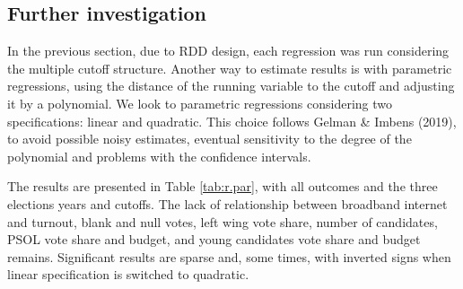 \documentclass[
  12pt,
]{article}
\begin{document}
\hypertarget{further-investigation}{%
\subsection{Further investigation}\label{further-investigation}}

In the previous section, due to RDD design, each regression was run
considering the multiple cutoff structure. Another way to estimate
results is with parametric regressions, using the distance of the
running variable to the cutoff and adjusting it by a polynomial. We look
to parametric regressions considering two specifications: linear and
quadratic. This choice follows Gelman \& Imbens (2019), to avoid
possible noisy estimates, eventual sensitivity to the degree of the
polynomial and problems with the confidence intervals.

The results are presented in Table \ref{tab:r.par}, with all outcomes
and the three elections years and cutoffs. The lack of relationship
between broadband internet and turnout, blank and null votes, left wing
vote share, number of candidates, PSOL vote share and budget, and young
candidates vote share and budget remains. Significant results are sparse
and, some times, with inverted signs when linear specification is
switched to quadratic.

\begingroup\fontsize{10}{12}\selectfont
\end{document}

